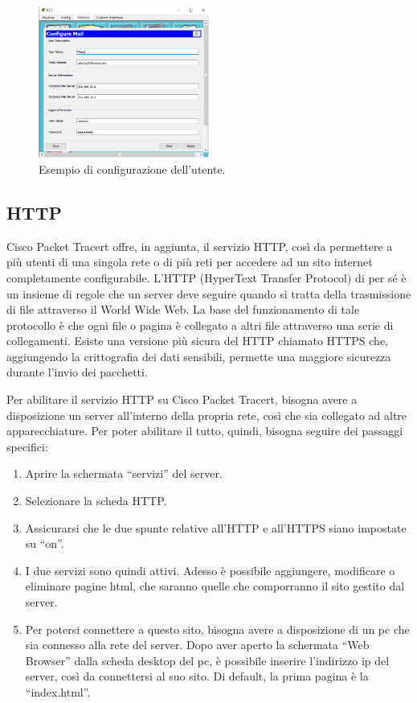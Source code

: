 \begin{figure}[htbp]
    \centering
    \includegraphics[width=0.5\textwidth]{images/06.servizi-rete/email/02.test.png}
    \caption{Esempio di configurazione dell’utente.}
    \label{fig:email-conf-client}
\end{figure}

\subsection{HTTP}
Cisco Packet Tracert offre, in aggiunta, il servizio HTTP, così da permettere a più utenti di una singola rete o di più reti per accedere ad un sito internet completamente configurabile. L’HTTP (HyperText Transfer Protocol) di per sé è un insieme di regole che un server deve seguire quando si tratta della trasmissione di file attraverso il World Wide Web. La base del funzionamento di tale protocollo è che ogni file o pagina è collegato a altri file attraverso una serie di collegamenti. Esiste una versione più sicura del HTTP chiamato HTTPS che, aggiungendo la crittografia dei dati sensibili, permette una maggiore sicurezza durante l’invio dei pacchetti.

Per abilitare il servizio HTTP su Cisco Packet Tracert, bisogna avere a disposizione un server all’interno della propria rete, così che sia collegato ad altre apparecchiature. Per poter abilitare il tutto, quindi, bisogna seguire dei passaggi specifici:

\begin{enumerate}
    \item Aprire la schermata “servizi” del server.
    \item Selezionare la scheda HTTP.
    \item Assicurarsi che le due spunte relative all’HTTP e all’HTTPS siano impostate su “on”.
    \item I due servizi sono quindi attivi. Adesso è possibile aggiungere, modificare o eliminare pagine html, che saranno quelle che comporranno il sito gestito dal server.
    \item Per potersi connettere a questo sito, bisogna avere a disposizione di un pc che sia connesso alla rete del server. Dopo aver aperto la schermata “Web Browser” dalla scheda desktop del pc, è possibile inserire l’indirizzo ip del server, così da connettersi al suo sito. Di default, la prima pagina è la “index.html”.
\end{enumerate}

